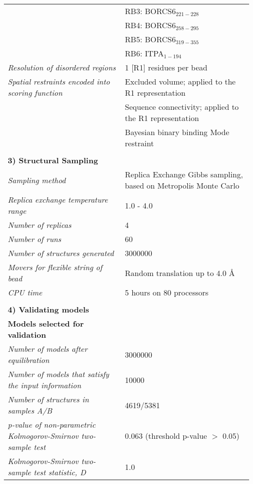 \documentclass[11pt,a4paper]{article}
\begin{document}
\begin{landscape}
\begin{longtable}{ p{} | p{} }
            & RB3: BORCS6$_{221-228}$ \\
            & RB4: BORCS6$_{258-295}$ \\
            & RB5: BORCS6$_{319-355}$ \\
            & RB6: ITPA$_{1-194}$ \\
                \textit{Resolution of disordered regions} & 1 [R1] residues per bead\\
                \textit{Spatial restraints encoded into scoring function} & Excluded volume; applied to the R1 representation\\
            & Sequence connectivity; applied to the R1 representation \\
            & Bayesian binary binding Mode restraint \\
          
   &  \\
    \normalsize{\textbf{3) Structural Sampling}} & \\
    \hline
            \textit{Sampling method} & Replica Exchange Gibbs sampling, based on Metropolis Monte Carlo\\
                \textit{Replica exchange temperature range} & 1.0 - 4.0\\
                \textit{Number of replicas} & 4\\
                \textit{Number of runs} & 60\\
                \textit{Number of structures generated} & 3000000\\
                \textit{Movers for flexible string of bead} & Random translation up to 4.0 \AA\\
                \textit{CPU time} & 5 hours on 80 processors\\
        
   &  \\

  \normalsize{\textbf{4) Validating models}} & \\
    \hline
   \textbf{Models selected for validation} & \\
    \hline
          \textit{Number of models after equilibration} & 3000000\\
                \textit{Number of models that satisfy the input information} & 10000\\
                \textit{Number of structures in samples A/B} & 4619/5381\\
                \textit{p-value of non-parametric Kolmogorov-Smirnov two-sample test} & 0.063 (threshold p-value $>$ 0.05)\\
                \textit{Kolmogorov-Smirnov two-sample test statistic, D} & 1.0\\
           \hline
    

\end{longtable}
\end{landscape}
\end{document}
